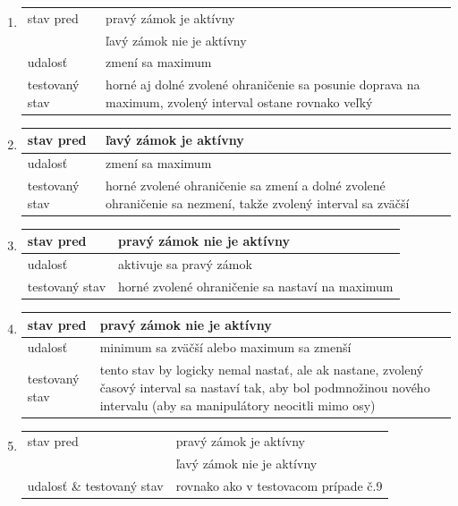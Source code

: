 \documentclass[
  digital, %
  twoside, %
  notable,   %
  nolof,   %
  nolot,   %
]{fithesis3}
\begin{document}
\begin{enumerate}
  \item
  \begin{tabular}{ | p{2.75cm} | p{8cm} | }
    \hline
    stav pred & pravý zámok je aktívny \\
    & ľavý zámok nie je aktívny \\ \hline
    udalosť & zmení sa maximum \\ \hline
    testovaný stav & horné aj dolné zvolené ohraničenie sa posunie doprava na maximum, zvolený interval ostane rovnako veľký \\ \hline
  \end{tabular}

  \item
  \begin{tabular}{ | p{2.75cm} | p{8cm} | }
    \hline
    stav pred & ľavý zámok je aktívny \\ \hline
    udalosť & zmení sa maximum \\ \hline
    testovaný stav & horné zvolené ohraničenie sa zmení a dolné zvolené ohraničenie sa nezmení, takže zvolený interval sa zväčší \\ \hline
  \end{tabular}
  
    \item
  \begin{tabular}{ | p{2.75cm} | p{8cm} | }
    \hline
    stav pred & pravý zámok nie je aktívny \\ \hline
    udalosť & aktivuje sa pravý zámok \\ \hline
    testovaný stav & horné zvolené ohraničenie sa nastaví na maximum \\ \hline
  \end{tabular}

    \item
  \begin{tabular}{ | p{2.75cm} | p{8cm} | }
    \hline
    stav pred & pravý zámok nie je aktívny \\ \hline
    udalosť & minimum sa zväčší alebo maximum sa zmenší\\ \hline
    testovaný stav & tento stav by logicky nemal nastať, ale ak nastane, zvolený časový interval sa nastaví tak, aby bol podmnožinou nového intervalu (aby sa manipulátory neocitli mimo osy) \\ \hline
  \end{tabular}

    \item
  \begin{tabular}{ | p{2.75cm} | p{8cm} | }
    \hline
    stav pred & pravý zámok je aktívny \\
    & ľavý zámok nie je aktívny \\ \hline
    udalosť \& testovaný stav & rovnako ako v testovacom prípade č.9\\ \hline
  \end{tabular}

\end{enumerate}
\end{document}
